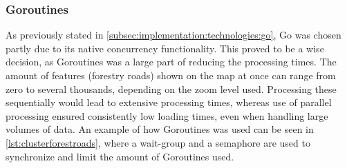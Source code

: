 \begin{figure}[h]

\end{figure}

\subsubsection{Goroutines}

As previously stated in \autoref{subsec:implementation:technologies:go}, Go was chosen partly due to its native concurrency functionality. This proved to be a wise decision, as Goroutines was a large part of reducing the processing times. The amount of features (forestry roads) shown on the map at once can range from zero to several thousands, depending on the zoom level used. Processing these sequentially would lead to extensive processing times, whereas use of parallel processing ensured consistently low loading times, even when handling large volumes of data. An example of how Goroutines was used can be seen in \autoref{lst:clusterforestroads}, where a wait-group and a semaphore are used to synchronize and limit the amount of Goroutines used.

